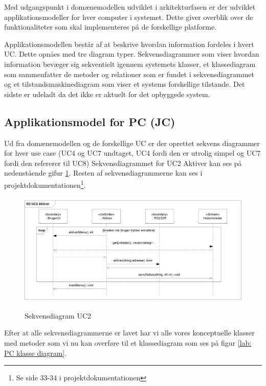 Med udgangspunkt i domænemodellen udviklet i arkitekturfasen er der udviklet applikationsmodeller for hver computer i systemet. Dette giver overblik over de funktionaliteter som skal implementeres på de forskellige platforme.

Applikationsmodellen består af at beskrive hvordan information fordeles i hvert UC. Dette opnåes med tre diagram typer. Sekvensdiagrammer som viser hvordan information bevæger sig sekventielt igennem systemets klasser, et klassediagram som sammenfatter de metoder og relationer som er fundet i sekvensdiagrammet og et tilstandsmaskinediagram som viser et systems forskellige tilstande. Det sidste er udeladt da det ikke er aktuelt for det opbyggede system.

%
%
\subsection{Applikationsmodel for PC (JC)}

Ud fra domænemodellen og de forskellige UC er der oprettet sekvens diagrammer for hver use case (UC4 og UC7 undtaget, UC4 fordi den er utrolig simpel og UC7 fordi den refererer til UC8) Sekvensdiagrammet for UC2 Aktiver kan ses på nedenstående gifur \ref{lab:Sekvensdiagram UC2}. Resten af sekvensdiagrammerne kan ses i projektdokumentationen\footnote{Se side 33-34 i projektdokumentationen}.

\begin{figure}[htbp] \centering
{\includegraphics[width=\textwidth]{billeder/uml/PC_UC2}}
\caption{Sekvensdiagram UC2}
\label{lab:Sekvensdiagram UC2}
\end{figure}

Efter at alle sekvensdiagrammerne er lavet har vi alle vores konceptuelle klasser med metoder som vi nu kan overføre til et klassediagram som ses på figur \ref{lab: PC klasse diagram}.

